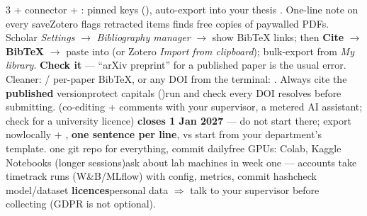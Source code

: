 \documentclass[10pt,a4paper]{article}
\begin{document}
\begin{multicols}{3}
 + connector +
: pinned keys
(), auto-export into your thesis . One-line
note on every save\dt Zotero flags retracted items\dt
{} finds free copies of
paywalled PDFs.
Scholar \emph{Settings} $\to$
\emph{Bibliography manager} $\to$ show BibTeX links; then \textbf{Cite} $\to$
\textbf{BibTeX} $\to$ paste into  (or Zotero \emph{Import from
clipboard}); bulk-export from \emph{My library}. \textbf{Check it} --- ``arXiv
preprint'' for a published paper is the usual error. Cleaner:
 / 
per-paper BibTeX, or any DOI from the terminal:
. Always
cite the \textbf{published} version\dt protect capitals ()\dt run
 and check every DOI resolves before submitting.
 (co-editing + comments
with your supervisor, a metered AI assistant; check for a university
licence)\dt {} \textbf{closes 1 Jan 2027}
--- do not start there; export now\dt locally  + , \textbf{one sentence
per line},  vs \dt start
from your department's template.
one git repo for everything, commit daily\dt free GPUs:
Colab, Kaggle Notebooks (longer sessions)\dt ask about lab machines in week one
--- accounts take time\dt track runs (W\&B/MLflow) with config, metrics, commit
hash\dt check model/dataset \textbf{licences}\dt personal data $\Rightarrow$
talk to your supervisor before collecting (GDPR is not optional).


\end{multicols}
\end{document}
